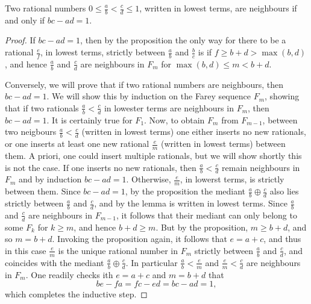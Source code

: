 \documentclass[12pt]{article}
\begin{document}
\begin{thm}Two rational numbers $0 \leq \frac ab < \frac cd \leq 1$, written in lowest terms, are neighbours if and only if $bc-ad = 1$.\end{thm}
\begin{proof}
If $bc-ad = 1$, then by the proposition the only way for there to be a rational $\frac ef$, in lowest terms, strictly between $\frac ab$ and $\frac bc$ is if $f \geq b+d > \max(b,d)$, and hence $\frac{a}{b}$ and $\frac{c}{d}$ are neighbours in $F_{m}$ for $\max(b,d) \leq m < b+d$.

Conversely, we will  prove that if two rational numbers are neighbours, then $bc-ad = 1$. We will show this by induction on the Farey sequence $F_m$, showing that if two rationals $\frac{a}{b} < \frac{c}{d}$ in lowester terms are neighbours in $F_m$, then $bc-ad = 1$. It is certainly true for $F_1$. Now, to obtain $F_{m}$ from $F_{m-1}$, between two neigbours $\frac{a}{b} < \frac{c}{d}$ (written in lowest terms) one either inserts no new rationals, or one inserts at least one new rational $\frac{e}{m}$ (written in lowest terms) between them. A priori, one could insert multiple rationals, but we will show shortly this is not the case. If one inserts no new rationals, then $\frac{a}{b} < \frac{c}{d}$ remain neighbours in $F_m$ and by induction $bc-ad = 1$. Otherwise, $\frac{e}{m}$, in lowerst terms, is strictly between them. Since $bc-ad = 1$, by the proposition the mediant $\frac{a}{b} \oplus \frac{c}{d}$ also lies strictly between $\frac{a}{b}$ and $\frac{c}{d}$, and by the lemma is written in lowest terms. Since $\frac{a}{b}$ and $\frac{c}{d}$ are neighbours in $F_{m-1}$, it follows that their mediant can only belong to some $F_k$ for $k \geq m$, and hence $b+d \geq m$. But by the proposition, $m \geq b+d$, and so $m = b+d$. Invoking the proposition again, it follows that $e = a+c$, and thus in this case $\frac{e}{m}$ is the unique rational number in $F_m$ strictly between $\frac{a}{b}$ and $\frac{c}{d}$, and coincides with the mediant $\frac a b \oplus \frac c d$. In particular $\frac{a}{b} < \frac{e}{m}$ and $\frac{e}{m} < \frac{c}{d}$ are neighbours in $F_m$. One readily checks ith $e = a+c$ and $m = b+d$ that \[be-fa = fc-ed = bc-ad = 1,\] which completes the inductive step.
\end{proof}
\end{document}
